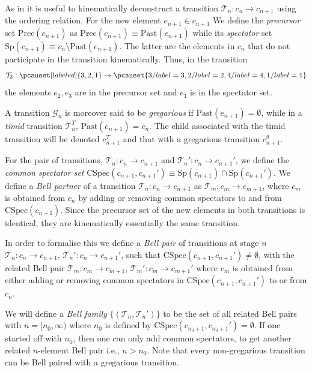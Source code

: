 \documentclass[11pt]{article}
\newcommand{\cT}{\mathcal T}
\newcommand{\rt}{\rightarrow}
\newcommand{\Past}{\mathrm{Past}}
\newcommand{\pre}{\mathrm{Prec}}
\newcommand{\spec}{\mathrm{Sp}}
\newcommand{\cspec}{\mathrm{CSpec}}
\newcommand{\cG}{\mathcal G}
\begin{document}
As in \cite{csgone}  it is useful to kinematically deconstruct a 
transition $\cT_n: c_n \rt  c_{n+1}$ using the ordering relation. 
For the new  element 
$e_{n+1} \in c_{n+1}$ We define the {\sl precursor} set $\pre(c_{n+1})$  as  $\pre(c_{n+1})\equiv
\Past(e_{n+1})$ while   its  {\sl spectator} set $\spec(c_{n+1})
\equiv c_n\setminus \Past(e_{n+1})$. The latter are the elements in $c_n$
that do not participate in the transition kinematically.   Thus, in
the transition
\begin{equation}
  \cT_3: \pcauset[labeled]{3,2,1} \rightarrow
  \pcauset{3/label=3,2/label=2,4/label=4,1/label=1}
\end{equation}
the elements $e_2,e_3$ are in the precursor set and $e_1$ is in the
spectator set. 



A transition $\cG_n$ 
is moreover said to be
{\sl gregarious}   if  $\Past(e_{n+1})=\emptyset$, while in a
{\sl timid} transition $\cT_n^T$,  $\Past(e_{n+1})= c_n$. The child associated
with the timid transition will be denoted $c_{n+1}^T$ and that with a
gregarious transition $c_{n+1}^g$.   



For the pair
of transitions,  $\cT_n: c_n \rt  c_{n+1}$ and  $\cT_n': c_n \rt
c_{n+1}'$, we define
the {\sl common spectator set} $\cspec(c_{n+1},c_{n+1}') \equiv \spec(c_{n+1}) \cap
\spec(c_{n+1}')$.    
We define a {\sl Bell partner}  of a 
transition $\cT_n:c_n \rightarrow c_{n+1}$ as $\cT_m:c_m \rightarrow
c_{m+1}$, where $ c_m$ is obtained from $c_n$ by  adding or removing
common spectators to and from $\cspec(c_{n+1})$. Since the precursor
set of the new elements in both transitions is identical, they are
kinematically  essentially the same transition. 
  
In order to formalise this we define a  {\sl Bell pair}  of
transitions at stage $n$
  $\cT_n:c_n \rightarrow c_{n+1}$,  $\cT_n':c_n \rightarrow c_{n+1}'$,
 such that $\cspec(c_{n+1},c_{n+1}') \neq \emptyset$, with the related 
 Bell pair 
$\cT_m:c_m \rightarrow c_{m+1}$,  $\cT_m':c_m
\rightarrow c_{m+1}'$ where $c_m$ is obtained from either 
adding or removing common spectators  in $\cspec(c_{n+1},c_{n+1}')$ to
or from $c_n$.   
  
We will define a {\sl Bell family} $\{(\cT_n,\cT_n') \}$ to be the set
of all related Bell pairs  with $n=[n_0, \infty)$  where $n_0$ is
defined by $\cspec(c_{n_0+1},c_{n_0+1}') =\emptyset$.  If one started off  with 
  $n_0$, then one can only add common spectators, to get another
  related $n$-element Bell pair i.e., $n > n_0$.  
Note that every non-gregarious transition can be Bell paired with a
gregarious transition. 
  
\end{document}
